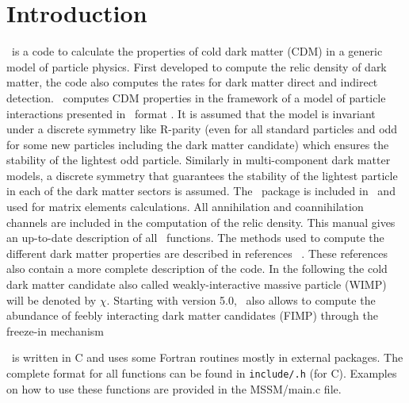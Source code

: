 \documentclass[12pt,a4paper]{article}
\begin{document}
\tableofcontents




\section{Introduction}
\micro\ is a code to calculate the properties of cold dark matter (CDM)  in a generic model of particle physics.  
 First developed to compute the relic density of dark matter, 
 the code also computes the rates for dark matter direct and  indirect detection. 
 \micro\ computes CDM properties in the framework of a model of particle
 interactions presented in \calchep\ format \cite{Pukhov:2004ca}. 
 It is assumed that the model is invariant under  a discrete symmetry like R-parity (even for 
all standard particles and odd for some new particles including the dark matter candidate) which ensures 
the stability of the lightest  odd particle.  Similarly in multi-component dark matter models,  a discrete symmetry that guarantees the stability of the lightest particle in each of the dark matter sectors  is assumed.
 The \calchep\  package is included in \micro\ and used for matrix elements calculations.
All annihilation and coannihilation channels are included in the computation of the relic density. 
This manual gives an up-to-date description of all \micro\ functions.  
The methods used to compute the different dark matter properties are described 
in references 
~\cite{Belanger:2001fz,Belanger:2004yn,Belanger:2006is,Belanger:2008sj,Belanger:2010gh,Belanger:2013oya,Belanger:2014vza,Barducci:2016pcb,Belanger:2018ccd}.
These references also contain  a more complete description of the code. In the following
the cold dark matter candidate also called weakly-interactive massive particle (WIMP)
will be denoted by $\chi$. 
Starting with version 5.0, \micro\ also allows to  compute
the abundance of feebly interacting dark matter candidates (FIMP) through the freeze-in
mechanism ~\cite{Belanger:2018ccd}


\micro\ is written in  C  and uses some Fortran routines mostly in external packages. 
The complete format  for all functions can be found in
\verb|include/.h| (for C). Examples on how to use these functions are provided   
in the MSSM/main.c file. 
 


 
\end{document}
